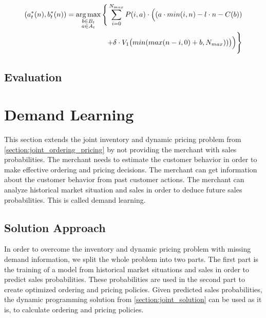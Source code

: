 \begin{equation}
\begin{split}
(a^*_t(n), b^*_t(n)) = \argmax_{\substack{b \in B_t \\ a \in A_t}} \Bigg\{
\sum_{i = 0}^{N_{max}}
P(i, a) \cdot \Big((
a \cdot min(i, n) %
- l \cdot n %
- C(b) %
) \\
+ \delta \cdot V_{1}\big(min(max(n - i, 0) + b, N_{max}))\big)
\Big)\Bigg\}
\end{split}
\label{eq:joint_best_price_order}
\end{equation}


\subsection{Evaluation}

\section{Demand Learning}
\label{section:demand_learning}

This section extends the joint inventory and dynamic pricing problem from \cref{section:joint_ordering_pricing} by not providing the merchant with sales probabilities.
The merchant needs to estimate the customer behavior in order to make effective ordering and pricing decisions.
The merchant can get information about the customer behavior from past customer actions.
The merchant can analyze historical market situation and sales in order to deduce future sales probabilities.
This is called demand learning.



\subsection{Solution Approach}
In order to overcome the inventory and dynamic pricing problem with missing demand information, we split the whole problem into two parts.
The first part is the training of a model from historical market situations and sales in order to predict sales probabilities.
These probabilities are used in the second part to create optimized ordering and pricing policies.
Given predicted sales probabilities, the dynamic programming solution from \cref{section:joint_solution} can be used as it is, to calculate ordering and pricing policies.


